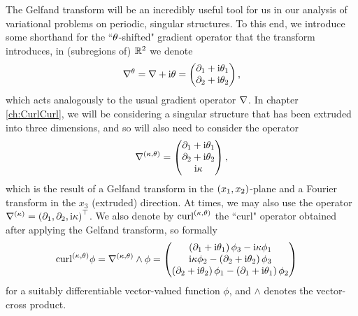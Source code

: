 The Gelfand transform will be an incredibly useful tool for us in our analysis of variational problems on periodic, singular structures.
To this end, we introduce some shorthand for the ``$\theta$-shifted" gradient operator that the transform introduces, in (subregions of) $\mathbb{R}^2$ we denote
\begin{align*}
	\nabla^{\theta} = \nabla + \mathrm{i}\theta 
	= \begin{pmatrix} \partial_1 + \mathrm{i}\theta_1 \\ \partial_2 + \mathrm{i}\theta_2 \end{pmatrix},
\end{align*}
which acts analogously to the usual gradient operator $\nabla$.
In chapter \ref{ch:CurlCurl}, we will be considering a singular structure that has been extruded into three dimensions, and so will also need to consider the operator
\begin{align*}
	\nabla^{\left( \kappa, \theta \right)} = 
	\begin{pmatrix} \partial_1 + \mathrm{i}\theta_1 \\ \partial_2 + \mathrm{i}\theta_2 \\ \mathrm{i}\kappa \end{pmatrix},
\end{align*}
which is the result of a Gelfand transform in the $\left( x_1,x_2 \right)$-plane and a Fourier transform in the $x_3$ (extruded) direction.
At times, we may also use the operator $\nabla^{(\kappa)} = \left( \partial_1, \partial_2, \mathrm{i}\kappa \right)^\top$.
We also denote by $\mathrm{curl}_{}^{\left( \kappa, \theta \right)}$ the ``curl" operator obtained after applying the Gelfand transform, so formally
\begin{align*}
	\mathrm{curl}_{}^{\left( \kappa, \theta \right)}\phi &= \nabla^{\left( \kappa, \theta \right)}\wedge\phi
	= 
	\begin{pmatrix}
		\left( \partial_1+\mathrm{i}\theta_1 \right)\phi_3 - \mathrm{i}\kappa\phi_1 \\
		\mathrm{i}\kappa\phi_2 - \left( \partial_2+\mathrm{i}\theta_2 \right)\phi_3 \\
		\left( \partial_2+\mathrm{i}\theta_2 \right)\phi_1 - \left( \partial_1+\mathrm{i}\theta_1 \right)\phi_2
	\end{pmatrix}
\end{align*}
for a suitably differentiable vector-valued function $\phi$, and $\wedge$ denotes the vector-cross product.

